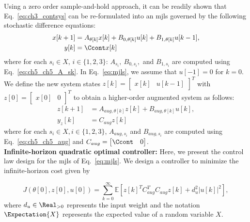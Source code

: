 Using a zero order sample-and-hold approach, it can be readily shown that Eq.~\eqref{eq:ch3_contsys} can be re-formulated into an \gls{mjls} governed by the following stochastic difference equations:
\begin{align}
x[k+1] &= A_{\theta[k]}x[k] + B_{0,\theta[k]}u[k] + B_{1,\theta[k]}u[k-1], \nonumber\\
y[k] &= \Ccont x[k]
~\label{eq:mjls}
\end{align}
where for each $s_i \in X$, $i \in \{1,2,3\}$: $A_{s_i},\ B_{0,s_i},$ and $B_{1,s_i}$ are computed using Eq.~\ref{eq:ch5_ch5_A_sk}.
In Eq.~\ref{eq:mjls}, we assume that $u[-1] = 0$ for $k = 0$. We define the new system states $z[k] = \begin{bmatrix}x[k] & u[k-1]\end{bmatrix}^T$ with $z[0] = \begin{bmatrix}x[0] & 0\end{bmatrix}^T$ to obtain a higher-order augmented system as follows:
\begin{align}
z[k+1] &= A_{aug,\theta[k]}z[k] + B_{aug,\theta[k]}u[k],\nonumber \\
y_z[k] &= C_{aug}z[k] \nonumber
\end{align}
where for each $s_i \in X, i \in \{1,2,3\}$, $A_{aug,s_i}$  and  $B_{aug,s_i}$ are computed using Eq.~\ref{eq:ch5_ch5_aug} and $C_{aug}=
\begin{bmatrix}
\Ccont & 0
\end{bmatrix}$. 
\\

\noindent\textbf{Infinite-horizon quadratic optimal controller:}
Here, we present the control law design for the \gls{mjls} of Eq.~\ref{eq:mjls}. We design a controller to minimize the infinite-horizon cost given by

\begin{equation}
J(\theta[0], z[0], u[0]) = \sum\limits_{k=0}^{\infty} \mathds{E}[z[k]^TC_{aug}^TC_{aug}z[k] + d_u^2|u[k]|^2],\nonumber
\end{equation}
where $d_u \in \Real_{>0}$ represents the input weight and the notation $\Expectation{X}$ represents the expected value of a random variable $X$. 


